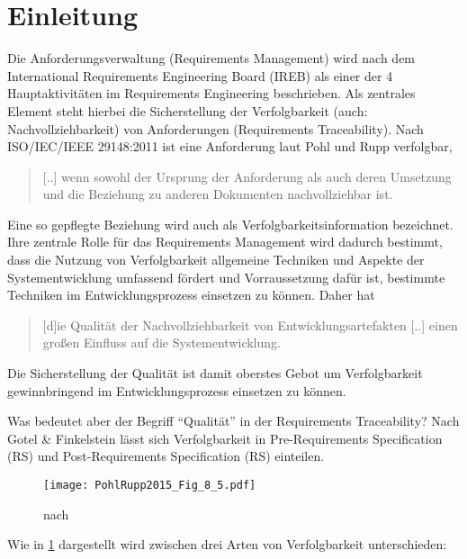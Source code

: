 \section{Einleitung}
\label{sec:Einleitung}
Die Anforderungsverwaltung (Requirements Management) wird nach dem International Requirements Engineering Board (IREB)  als einer der 4 Hauptaktivitäten im Requirements Engineering beschrieben.
Als zentrales Element steht hierbei die Sicherstellung der Verfolgbarkeit (auch: Nachvollziehbarkeit) von Anforderungen (Requirements Traceability). \cite{Pohl2015BasiswissenIREB-Standard}
Nach ISO/IEC/IEEE 29148:2011 ist eine Anforderung laut Pohl und Rupp verfolgbar,
\begin{quote}
[..] wenn sowohl der Ursprung der Anforderung als auch deren Umsetzung und die Beziehung zu anderen Dokumenten nachvollziehbar ist. \cite[S.48]{Pohl2015BasiswissenIREB-Standard}
\end{quote}
Eine so gepflegte Beziehung wird auch als Verfolgbarkeitsinformation bezeichnet. Ihre zentrale Rolle für das Requirements Management wird dadurch bestimmt, dass die Nutzung von Verfolgbarkeit allgemeine Techniken und Aspekte der Systementwicklung umfassend fördert und Vorraussetzung dafür ist, bestimmte Techniken im Entwicklungsprozess einsetzen zu können. \cite{Pohl2008RequirementsTechniken} Daher hat 
\begin{quote}
[d]ie Qualität der Nachvollziehbarkeit von Entwicklungsartefakten [..] einen großen Einfluss auf die Systementwicklung. \cite[S.507]{Pohl2008RequirementsTechniken}
\end{quote}
Die Sicherstellung der Qualität ist damit oberstes Gebot um Verfolgbarkeit gewinnbringend im Entwicklungsprozess einsetzen zu können. 

Was bedeutet aber der Begriff \enquote{Qualität} in der Requirements Traceability? Nach Gotel \& Finkelstein lässt sich Verfolgbarkeit in Pre-Requirements Specification (RS) und Post-Requirements Specification (RS) einteilen. 

\begin{figure}[!htb]
  \centering
  \texttt{[image: PohlRupp2015\_Fig\_8\_5.pdf]}
  \caption{nach \cite[Fig. 8.5]{Pohl2015BasiswissenIREB-Standard}}
  \label{fig:pohlrupp_prepostrs}
\end{figure}

Wie in \ref{fig:pohlrupp_prepostrs} dargestellt wird zwischen drei Arten von Verfolgbarkeit unterschieden:

